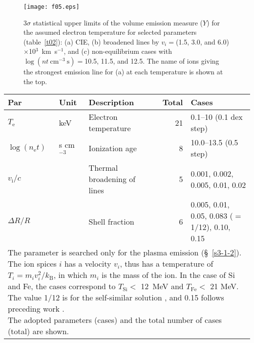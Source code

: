 \documentclass[]{pasj01}
\begin{document}
\begin{figure}
 \begin{center}
  \texttt{[image: f05.eps]}
 \end{center}
 \caption{3$\sigma$ statistical upper limits of the volume emission measure ($Y$) for the
 assumed electron temperature for selected parameters (table~\ref{t02}): (a) CIE, (b)
 broadened lines by $v_{i}=$(1.5, 3.0, and 6.0) $\times$10$^{3}$~km~s$^{-1}$, and (c)
 non-equilibrium cases with $\log{(nt~\mathrm{cm^{-3}~s})}=$10.5, 11.5, and 12.5. The
 name of ions giving the strongest emission line for (a) at each temperature is shown at
 the top.}
\label{f05}
\end{figure}

\begin{table*}[ht]
 \caption{Investigated parameter space.}
 \label{t02}
 \begin{center}
  \begin{tabular}{lllrl}
   \hline
   \hline
   Par & Unit & Description & Total\footnotemark[$\S$] & Cases\footnotemark[$\S$] \\
   \hline
   $T_{\mathrm{e}}$ & keV  & Electron temperature & 21 & 0.1--10 (0.1 dex step) \\
   $\log{(n_{\mathrm{e}}t)}$\footnotemark[$*$] & s cm$^{-3}$ & Ionization age & 8 & 10.0--13.5 (0.5 step) \\
   $v_{\mathrm{i}}/c$\footnotemark[$*\dagger$] & & Thermal broadening of lines & 5 & 0.001, 0.002, 0.005, 0.01, 0.02 \\
   $\Delta R/R$\footnotemark[$\ddagger$] & & Shell fraction & 6 & 0.005, 0.01, 0.05,
		   0.083 ($=$1/12), 0.10, 0.15 \\
   \hline
   \multicolumn{5}{l}{\parbox{160mm}{
   \footnotesize
   \par \noindent
   \footnotemark[$*$] The parameter is searched only for the plasma emission (\S~\ref{s3-1-2}).\\
   \footnotemark[$\dagger$] The ion spices $i$ has a velocity $v_{i}$, thus has a
   temperature of $T_{i} = m_{i}v_{i}^{2}$/$k_{\mathrm{B}}$, in which $m_{i}$ is the mass of the
   ion. In the case of Si and Fe, the cases correspond to $T_{\mathrm{Si}}<$ 12~MeV and $T_{\mathrm{Fe}}<$ 21 MeV.\\
   \footnotemark[$\ddagger$] The value 1/12 is for the self-similar solution
   \citep{sedov59}, and 0.15 follows preceding work \citep{seward06,frail95}.\\
   \footnotemark[$\S$] The adopted parameters (cases) and the total number of cases
   (total) are shown.\\
   }}
  \end{tabular}
 \end{center}
\end{table*}
\end{document}
